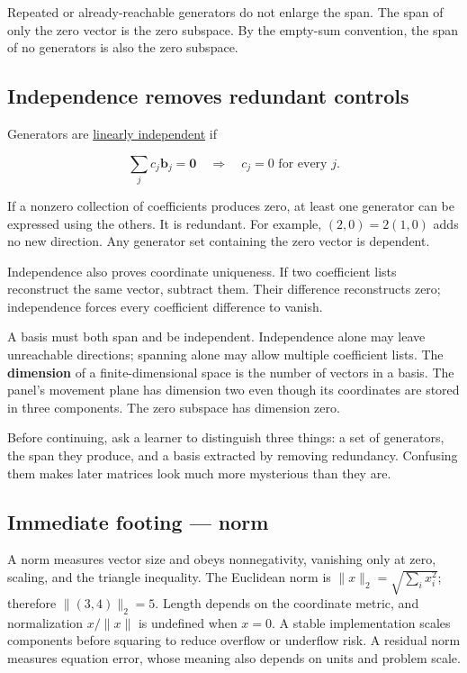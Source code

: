 Repeated or already-reachable generators do not enlarge the span. The span of only the zero vector is the zero subspace. By the empty-sum convention, the span of no generators is also the zero subspace.

\subsection{Independence removes redundant controls}\label{01-foundations-i-ch017-independence-removes-redundant-controls}

Generators are \hyperref[01-foundations-i-ch019-coordinates-can-change-while-the-geometric-object-stays-still]{linearly independent} if

\[
\sum_jc_j\mathbf b_j=\mathbf0
\quad\Longrightarrow\quad c_j=0\text{ for every }j.
\]

If a nonzero collection of coefficients produces zero, at least one generator can be expressed using the others. It is redundant. For example, \((2,0)=2(1,0)\) adds no new direction. Any generator set containing the zero vector is dependent.

Independence also proves coordinate uniqueness. If two coefficient lists reconstruct the same vector, subtract them. Their difference reconstructs zero; independence forces every coefficient difference to vanish.

A basis must both span and be independent. Independence alone may leave unreachable directions; spanning alone may allow multiple coefficient lists. The \textbf{dimension} of a finite-dimensional space is the number of vectors in a basis. The panel's movement plane has dimension two even though its coordinates are stored in three components. The zero subspace has dimension zero.

Before continuing, ask a learner to distinguish three things: a set of generators, the span they produce, and a basis extracted by removing redundancy. Confusing them makes later matrices look much more mysterious than they are.

\subsection{Immediate footing --- norm}\label{01-foundations-i-ch017-immediate-footing-norm}

A norm measures vector size and obeys nonnegativity, vanishing only at zero, scaling, and the triangle inequality. The Euclidean norm is \(\|x\|_2=\sqrt{\sum_i x_i^2}\); therefore \(\|(3,4)\|_2=5\). Length depends on the coordinate metric, and normalization \(x/\|x\|\) is undefined when \(x=0\). A stable implementation scales components before squaring to reduce overflow or underflow risk. A residual norm measures equation error, whose meaning also depends on units and problem scale.

